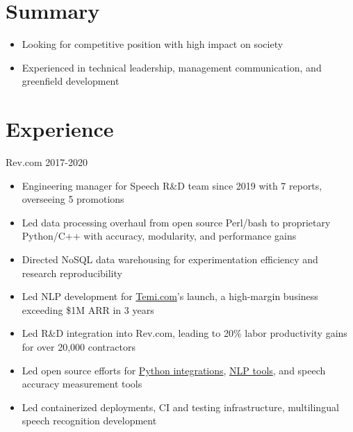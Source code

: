\documentclass[line,margin]{res}
\begin{document}
    \address{\href{mailto:jdong42@gmail.com}{jdong42@gmail.com}}

\begin{resume}

\vspace{-8pt}
\section{Summary}
    \vspace{22pt}
        \begin{itemize} \itemsep -2pt
        \item Looking for competitive position with high impact on society
        \item Experienced in technical leadership, management communication, and greenfield development
        \end{itemize}

\vspace{-8pt}
\section{Experience} 
    \vspace{12pt}
    Rev.com
    \hfill  2017-2020
        \begin{itemize} \itemsep -2pt
        \item Engineering manager for Speech R\&D team since 2019 with 7 reports, overseeing 5 promotions
        \item Led data processing overhaul from open source Perl/bash to proprietary Python/C++ with accuracy, modularity, and performance gains
        \item Directed NoSQL data warehousing for experimentation efficiency and research reproducibility
        \item Led NLP development for \href{https://temi.com}{Temi.com}'s launch, a high-margin business exceeding \$1M ARR in 3 years
        \item Led R\&D integration into Rev.com, leading to 20\% labor productivity gains for over 20,000 contractors
        \item Led open source efforts for \href{https://github.com/revdotcom/revai-python-sdk}{Python integrations}, \href{https://github.com/revdotcom/words2num}{NLP tools}, and speech accuracy measurement tools
        \item Led containerized deployments, CI and testing infrastructure, multilingual speech recognition development
        \end{itemize}


\end{resume}
\end{document}
